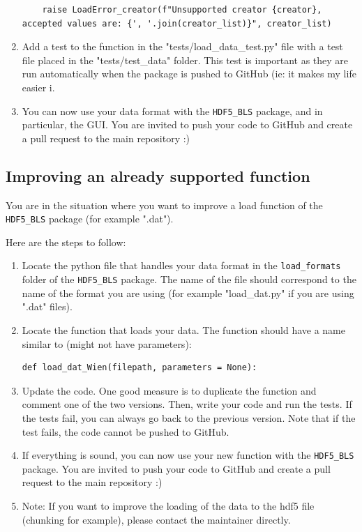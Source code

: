\documentclass{book}
\begin{document}
\begin{enumerate}
\begin{lstlisting}
    raise LoadError_creator(f"Unsupported creator {creator}, accepted values are: {', '.join(creator_list)}", creator_list)
\end{lstlisting}
                \item Add a test to the function in the "tests/load\_data\_test.py" file with a test file placed in the "tests/test\_data" folder. This test is important as they are run automatically when the package is pushed to GitHub (ie: it makes my life easier ^^). 
                \item You can now use your data format with the \texttt{HDF5\_BLS} package, and in particular, the GUI. You are invited to push your code to GitHub and create a pull request to the main repository :)
            \end{enumerate}

        \subsection{Improving an already supported function} \label{subsec:load_data.improvement}
            \begin{tcolorbox}
                You are in the situation where you want to improve a load function of the \texttt{HDF5\_BLS} package (for example ".dat").
            \end{tcolorbox}

            Here are the steps to follow:
            \begin{enumerate}
                \item Locate the python file that handles your data format in the \texttt{load\_formats} folder of the \texttt{HDF5\_BLS} package. The name of the file should correspond to the name of the format you are using (for example "load\_dat.py" if you are using ".dat" files).
                \item Locate the function that loads your data. The function should have a name similar to (might not have parameters):
\begin{lstlisting}
def load_dat_Wien(filepath, parameters = None):
\end{lstlisting}
                \item Update the code. One good measure is to duplicate the function and comment one of the two versions. Then, write your code and run the tests. If the tests fail, you can always go back to the previous version. Note that if the test fails, the code cannot be pushed to GitHub.
                \item If everything is sound, you can now use your new function with the \texttt{HDF5\_BLS} package. You are invited to push your code to GitHub and create a pull request to the main repository :)
                \item Note: If you want to improve the loading of the data to the hdf5 file (chunking for example), please contact the maintainer directly.
        \end{enumerate}
\end{document}
